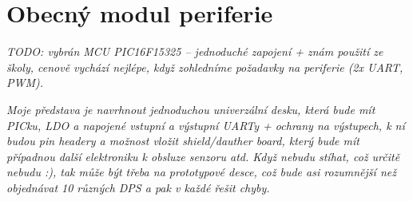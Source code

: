 \section{Obecný modul periferie}
    \textit{    TODO: vybrán MCU PIC16F15325 -- jednoduché zapojení + znám použití ze školy, cenově vychází nejlépe, když zohledníme požadavky na periferie (2x UART, PWM). } 

    \textit{
        Moje představa je navrhnout jednoduchou univerzální desku, která bude mít PICku, LDO a napojené vstupní a výstupní UARTy + ochrany na výstupech, k ní budou pin headery a možnost vložit shield/dauther board, který bude mít případnou další elektroniku k obsluze senzoru atd. Když nebudu stíhat, což určitě nebudu :), tak může být třeba na prototypové desce, což bude asi rozumnější než objednávat 10 různých DPS a pak v každé řešit chyby.} 